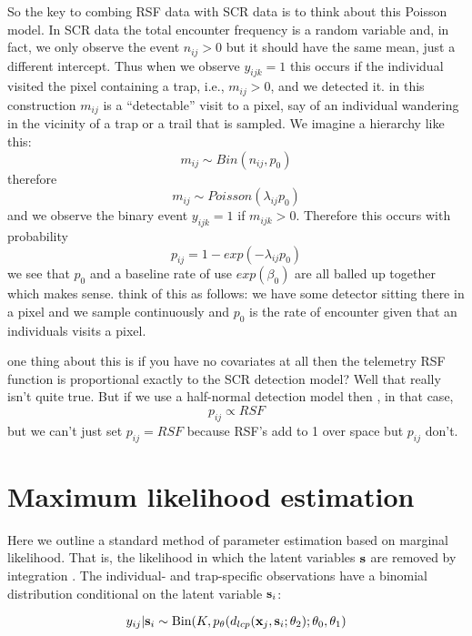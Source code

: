 \documentclass[12pt]{article}
\begin{document}
\begin{spacing}{1.8}
So the key to combing RSF data with SCR data is to think about this
Poisson model. In SCR data the total encounter frequency is a random
variable and, in fact, we only observe the event $n_{ij}>0$ but it
should have the same mean, just a different intercept. Thus when we
observe $y_{ijk} = 1$ this occurs if the individual visited the pixel
containing a trap, i.e.,  $m_{ij}>0$, and we detected it. in this
construction $m_{ij}$ is a ``detectable'' visit to a pixel, say of an
individual wandering in the vicinity of a trap or a trail that is
sampled. 
We imagine a hierarchy like this:
\[
m_{ij} \sim Bin(n_{ij}, p_{0})
\]
therefore
\[
m_{ij} \sim Poisson( \lambda_{ij} p_{0} )
\]
and
we observe the binary event $y_{ijk} = 1$ if $m_{ijk}>0$. Therefore 
this occurs with probability 
\[
 p_{ij} = 1-exp(- \lambda_{ij} p_{0} ) 
\]
we see that $p_{0}$ and a baseline rate of use  $exp(\beta_{0})$ are
all balled up together which makes sense. 
think of this as follows: we have some detector sitting there in a
pixel and we sample continuously and $p_{0}$ is the rate of encounter
given that an individuals visits a pixel. 




one thing about this is if you have no covariates at all then
the telemetry RSF function is proportional exactly to the SCR 
detection model? Well that really isn't quite true. But if 
we use a half-normal detection model then , in that case, 
\[
p_{ij} \propto RSF
\]
but we can't just set $p_{ij} = RSF$ because RSF's add to 1 over space
but $p_{ij}$ don't. 



\section{Maximum likelihood estimation}
\label{sec.mle}

Here we outline a standard method of parameter estimation based on
marginal likelihood. That is, the likelihood in which the latent
variables ${\bf s}$ are removed by integration \citep{borchers_efford:2008}.
The individual- and trap-specific observations have a binomial
distribution conditional on the latent variable ${\bf s}_{i}$:

\begin{equation}
	y_{ij}| {\bf s}_{i} \sim \mbox{Bin}(K, p_{\theta}(d_{lcp}({\bf x}_{j},{\bf s}_{i};\theta_{2}); \theta_{0}, \theta_{1})
\label{mle.eq.cond-on-s}
\end{equation}


\end{spacing}
\end{document}

